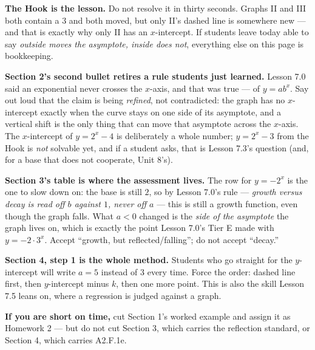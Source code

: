 \documentclass[10pt]{article}
\begin{document}
\begin{teachernote}
\textbf{The Hook is the lesson.} Do not resolve it in thirty seconds. Graphs II and III both contain a
$3$ and both moved, but only II's dashed line is somewhere new --- and that is exactly why only II has
an $x$-intercept. If students leave today able to say \emph{outside moves the asymptote, inside does
not}, everything else on this page is bookkeeping.

\textbf{Section 2's second bullet retires a rule students just learned.} Lesson 7.0 said an exponential
never crosses the $x$-axis, and that was true --- of $y=ab^{x}$. Say out loud that the claim is being
\emph{refined}, not contradicted: the graph has no $x$-intercept exactly when the curve stays on one
side of its asymptote, and a vertical shift is the only thing that can move that asymptote across the
$x$-axis. The $x$-intercept of $y=2^{x}-4$ is deliberately a whole number; $y=2^{x}-3$ from the Hook is
\emph{not} solvable yet, and if a student asks, that is Lesson 7.3's question (and, for a base that does
not cooperate, Unit 8's).

\textbf{Section 3's table is where the assessment lives.} The row for $y=-2^{x}$ is the one to slow down
on: the base is still $2$, so by Lesson 7.0's rule --- \emph{growth versus decay is read off $b$ against
$1$, never off $a$} --- this is still a growth function, even though the graph falls. What $a<0$ changed
is the \emph{side of the asymptote} the graph lives on, which is exactly the point Lesson 7.0's Tier E
made with $y=-2\cdot3^{x}$. Accept ``growth, but reflected/falling''; do not accept ``decay.''

\textbf{Section 4, step 1 is the whole method.} Students who go straight for the $y$-intercept will write
$a=5$ instead of $3$ every time. Force the order: dashed line first, then $y$-intercept minus $k$, then
one more point. This is also the skill Lesson 7.5 leans on, where a regression is judged against a graph.

\textbf{If you are short on time,} cut Section 1's worked example and assign it as Homework 2 --- but do
not cut Section 3, which carries the reflection standard, or Section 4, which carries A2.F.1e.
\end{teachernote}
\end{document}
